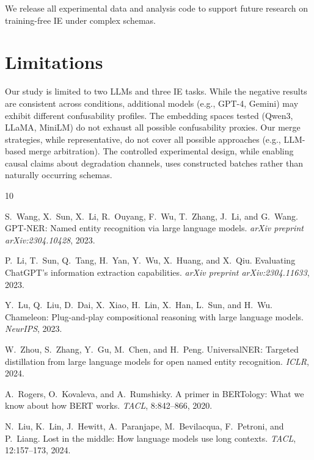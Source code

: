 \documentclass[11pt,a4paper]{article}
\begin{document}
We release all experimental data and analysis code to support future research on training-free IE under complex schemas.

\section*{Limitations}

Our study is limited to two LLMs and three IE tasks. While the negative results are consistent across conditions, additional models (e.g., GPT-4, Gemini) may exhibit different confusability profiles. The embedding spaces tested (Qwen3, LLaMA, MiniLM) do not exhaust all possible confusability proxies. Our merge strategies, while representative, do not cover all possible approaches (e.g., LLM-based merge arbitration). The controlled experimental design, while enabling causal claims about degradation channels, uses constructed batches rather than naturally occurring schemas.


\begin{thebibliography}{10}

S.~Wang, X.~Sun, X.~Li, R.~Ouyang, F.~Wu, T.~Zhang, J.~Li, and G.~Wang.
\newblock GPT-NER: Named entity recognition via large language models.
\newblock \emph{arXiv preprint arXiv:2304.10428}, 2023.

P.~Li, T.~Sun, Q.~Tang, H.~Yan, Y.~Wu, X.~Huang, and X.~Qiu.
\newblock Evaluating ChatGPT's information extraction capabilities.
\newblock \emph{arXiv preprint arXiv:2304.11633}, 2023.

Y.~Lu, Q.~Liu, D.~Dai, X.~Xiao, H.~Lin, X.~Han, L.~Sun, and H.~Wu.
\newblock Chameleon: Plug-and-play compositional reasoning with large language models.
\newblock \emph{NeurIPS}, 2023.

W.~Zhou, S.~Zhang, Y.~Gu, M.~Chen, and H.~Peng.
\newblock UniversalNER: Targeted distillation from large language models for open named entity recognition.
\newblock \emph{ICLR}, 2024.

A.~Rogers, O.~Kovaleva, and A.~Rumshisky.
\newblock A primer in BERTology: What we know about how BERT works.
\newblock \emph{TACL}, 8:842--866, 2020.

N.~Liu, K.~Lin, J.~Hewitt, A.~Paranjape, M.~Bevilacqua, F.~Petroni, and P.~Liang.
\newblock Lost in the middle: How language models use long contexts.
\newblock \emph{TACL}, 12:157--173, 2024.

\end{thebibliography}
\end{document}
